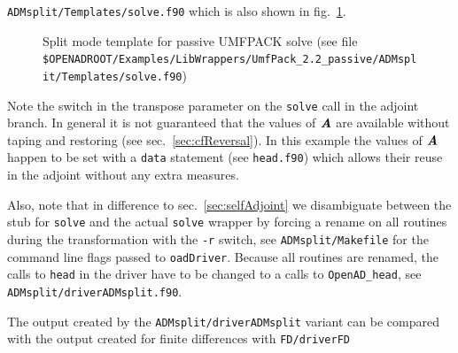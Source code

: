 \documentclass{book}
\newcommand{\bmA}{\mbox{\bf\em A}}
\newcommand{\refsec}[1]{{sec.~\ref{#1}}}
\newcommand{\reffig}[1]{{fig.~\ref{#1}}}
\begin{document}
\lstinline{ADMsplit/Templates/solve.f90} which is also shown in \reffig{fig:umf22passiveTemplate}.
\begin{figure}[tb]
\begin{minipage}{\linewidth}
\small
\end{minipage}
\caption{Split mode template for passive UMFPACK solve (see file 
\lstinline{$OPENADROOT/Examples/LibWrappers/UmfPack_2.2_passive/ADMsplit/Templates/solve.f90}) %
}\label{fig:umf22passiveTemplate}
\end{figure}
Note the switch in the transpose parameter on the \lstinline{solve} call in the adjoint branch.
In general it is not guaranteed that the values of $\bmA$ are available without taping and restoring (see \refsec{sec:cfReversal}).
In this example the values of $\bmA$ happen to be set with a \lstinline{data} statement (see \lstinline{head.f90}) which allows their reuse in the 
adjoint without any extra measures.  

Also, note that in difference to \refsec{sec:selfAdjoint} we disambiguate between the stub for \lstinline{solve} 
and the actual \lstinline{solve} wrapper by forcing a rename on all routines during the transformation with 
the \lstinline{-r} switch, see \lstinline{ADMsplit/Makefile} for the command line flags passed to \lstinline{oadDriver}.
Because all routines are renamed, the calls to \lstinline{head} in the driver have to be changed to a calls to 
\lstinline{OpenAD_head}, see \lstinline{ADMsplit/driverADMsplit.f90}.    

The output created  by the \lstinline{ADMsplit/driverADMsplit} variant can be compared with the output created for finite differences with 
\lstinline{FD/driverFD}
\end{document}
